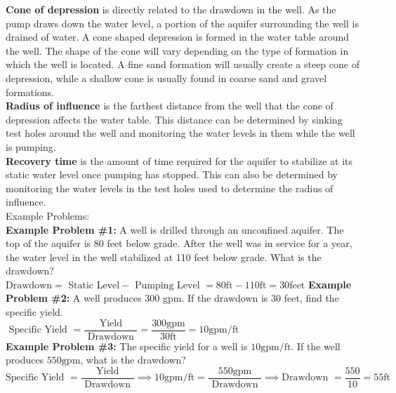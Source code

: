 \vspace{0.3cm}
\textbf{Cone of depression} is directly related to the drawdown in the well. As the pump draws down the water level, a portion of the aquifer surrounding the well is drained of water. A cone shaped depression is formed in the water table around the well. The shape of the cone will vary depending on the type of formation in which the well is located. A fine sand formation will usually create a steep cone of depression, while a shallow cone is usually found in coarse sand and gravel formations.\\
\vspace{0.3cm}
\textbf{Radius of influence} is the farthest distance from the well that the cone of depression affects the water table. This distance can be determined by sinking test holes around the well and monitoring the water levels in them while the well is pumping.\\
\vspace{0.3cm}
\textbf{Recovery time} is the amount of time required for the aquifer to stabilize at its static water level once pumping has stopped. This can also be determined by monitoring the water levels in the test holes used to determine the radius of influence.\\
\vspace{0.5cm}
Example Problems:\\
\vspace{0.2cm}
\textbf{Example Problem \#1:} A well is drilled through an unconfined aquifer. The top of the aquifer is 80 feet below grade. After the well was in service for a year, the water level in the well stabilized at 110 feet below grade. What is the drawdown?\\
$\text {Drawdown} =\text { Static Level}-\text { Pumping Level } =80 \mathrm{ft}-110 \mathrm{ft}=30 \mathrm{feet}$
\vspace{0.2cm}
\textbf{Example Problem \#2:} A well produces 300 gpm. If the drawdown is 30 feet, find the specific yield.\\
$\text { Specific Yield } =\dfrac{\text { Yield }}{\text { Drawdown }} =\dfrac{300 \mathrm{gpm}}{30 \mathrm{ft}} =10 \mathrm{gpm} / \mathrm{ft}$\\
  \vspace{0.3cm}
\textbf{Example Problem \#3:} The specific yield for a well is $10 \mathrm{gpm} / \mathrm{ft}$. If the well produces $550 \mathrm{gpm}$, what is the drawdown?\\
  \vspace{0.3cm}
$\text {Specific Yield }=\dfrac{\text { Yield }}{\text { Drawdown }}\implies 10 \mathrm{gpm} / \mathrm{ft}=\dfrac{550 \mathrm{gpm}}{\text { Drawdown }} \implies \text {Drawdown }= \dfrac{550}{10}=\boxed{55 \mathrm{ft}}$ \\
